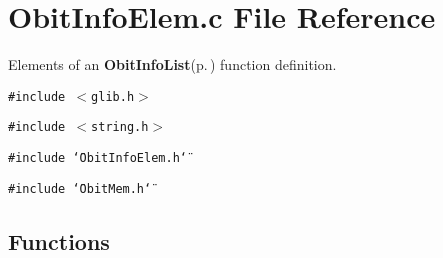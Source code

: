 \section{Obit\-Info\-Elem.c File Reference}
\label{ObitInfoElem_8c}
Elements of an {\bf Obit\-Info\-List}{\rm (p.\,\pageref{structObitInfoList})} function definition. 

{\tt \#include $<$glib.h$>$}\par
{\tt \#include $<$string.h$>$}\par
{\tt \#include \char`\"{}Obit\-Info\-Elem.h\char`\"{}}\par
{\tt \#include \char`\"{}Obit\-Mem.h\char`\"{}}\par
\subsection*{Functions}
